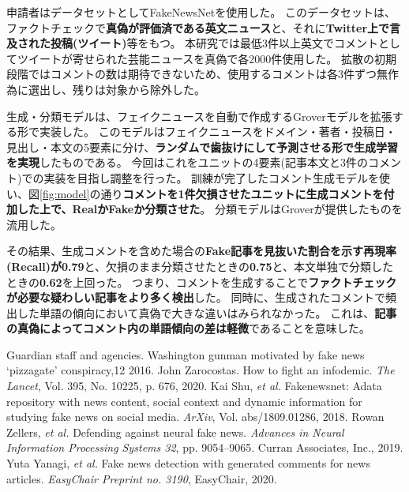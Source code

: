 {	申請者はデータセットとしてFakeNewsNet\cite{Shu2018FakeNewsNetAD}を使用した。
	このデータセットは、ファクトチェックで\textbf{真偽が評価済である英文ニュース}と、それに\textbf{Twitter上で言及された投稿(ツイート)}等をもつ。
	本研究では最低3件以上英文でコメントとしてツイートが寄せられた芸能ニュースを真偽で各2000件使用した。
	拡散の初期段階ではコメントの数は期待できないため、使用するコメントは各3件ずつ無作為に選出し、残りは対象から除外した。

	生成・分類モデルは、フェイクニュースを自動で作成するGroverモデル\cite{NIPS2019_9106}を拡張する形で実装した。
	このモデルはフェイクニュースをドメイン・著者・投稿日・見出し・本文の5要素に分け、\textbf{ランダムで歯抜けにして予測させる形で生成学習を実現}したものである。
	今回はこれをユニットの4要素(記事本文と3件のコメント)での実装を目指し調整を行った。
	訓練が完了したコメント生成モデルを使い、図\ref{fig:model}の通り\textbf{コメントを1件欠損させたユニットに生成コメントを付加した上で、RealかFakeか分類させた}。
	分類モデルはGroverが提供したものを流用した。

	その結果、生成コメントを含めた場合の\textbf{Fake記事を見抜いた割合を示す再現率(Recall)が0.79}と、欠損のまま分類させたときの\textbf{0.75}と、本文単独で分類したときの\textbf{0.62}を上回った。
	つまり、コメントを生成することで\textbf{ファクトチェックが必要な疑わしい記事をより多く検出}した\cite{EasyChair:3190}。
	同時に、生成されたコメントで頻出した単語の傾向において真偽で大きな違いはみられなかった。
	これは、\textbf{記事の真偽によってコメント内の単語傾向の差は軽微}であることを意味した。

	{\small 
	\begin{thebibliography}{99}
		\setlength{\parskip}{0cm}
		\setlength{\itemsep}{0cm}
		 Guardian staff and agencies. Washington gunman motivated by fake news `pizzagate' conspiracy,12 2016.
		 John Zarocostas. How to fight an infodemic. \textit{The Lancet}, Vol. 395, No. 10225, p. 676, 2020.
		 Kai Shu, \textit{et al.} Fakenewsnet: Adata repository with news content, social context and dynamic information for studying fake news on social media. \textit{ArXiv}, Vol. abs/1809.01286, 2018.
		 Rowan Zellers, \textit{et al.} Defending against neural fake news. \textit{Advances in Neural Information Processing Systems 32}, pp. 9054–9065. Curran Associates, Inc., 2019.
		 Yuta Yanagi, \textit{et al.} Fake news detection with generated comments for news articles. \textit{EasyChair Preprint no. 3190}, EasyChair, 2020.
	\end{thebibliography}
	}
}

